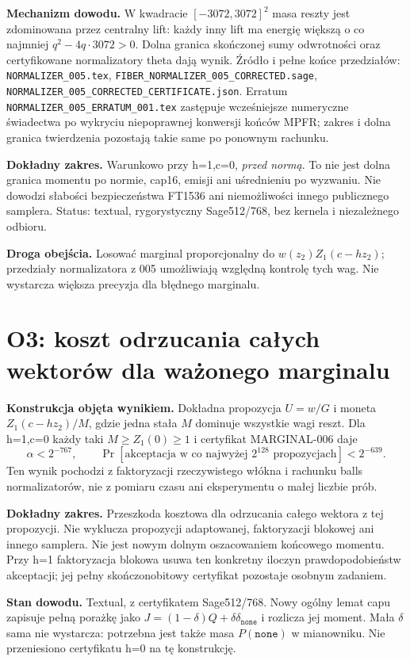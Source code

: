 \documentclass[11pt,a4paper]{article}
\newcommand{\code}[1]{\nolinkurl{#1}}
\begin{document}
\textbf{Mechanizm dowodu.} W kwadracie $[-3072,3072]^2$ masa reszty
jest zdominowana przez centralny lift: każdy inny lift ma energię większą
o co najmniej $q^2-4q\cdot3072>0$. Dolna granica skończonej sumy
odwrotności oraz certyfikowane normalizatory theta dają wynik.
Źródło i pełne końce przedziałów: \code{NORMALIZER_005.tex},
\code{FIBER_NORMALIZER_005_CORRECTED.sage},
\code{NORMALIZER_005_CORRECTED_CERTIFICATE.json}.
Erratum \code{NORMALIZER_005_ERRATUM_001.tex} zastępuje wcześniejsze
numeryczne świadectwa po wykryciu niepoprawnej konwersji końców MPFR;
zakres i dolna granica twierdzenia pozostają takie same po ponownym rachunku.

\textbf{Dokładny zakres.} Warunkowo przy h=1,c=0, \emph{przed normą}.
To nie jest dolna granica momentu po normie, cap16, emisji ani uśrednieniu
po wyzwaniu. Nie dowodzi słabości bezpieczeństwa FT1536 ani niemożliwości
innego publicznego samplera. Status: textual, rygorystyczny Sage512/768,
bez kernela i niezależnego odbioru.

\textbf{Droga obejścia.} Losować marginal proporcjonalny do
$w(z_2)Z_1(c-hz_2)$; przedziały normalizatora z 005 umożliwiają względną
kontrolę tych wag. Nie wystarcza większa precyzja dla błędnego marginalu.

\section{O3: koszt odrzucania całych wektorów dla ważonego marginalu}
\textbf{Konstrukcja objęta wynikiem.} Dokładna propozycja $U=w/G$ i moneta
$Z_1(c-hz_2)/M$, gdzie jedna stała $M$ dominuje wszystkie wagi reszt.
Dla h=1,c=0 każdy taki $M\ge Z_1(0)\ge1$ i certyfikat MARGINAL-006 daje
\[
 \alpha<2^{-767},\qquad
 \Pr[\text{akceptacja w co najwyżej }2^{128}\text{ propozycjach}]<2^{-639}.
\]
Ten wynik pochodzi z faktoryzacji rzeczywistego włókna i rachunku balls
normalizatorów, nie z pomiaru czasu ani eksperymentu o małej liczbie prób.

\textbf{Dokładny zakres.} Przeszkoda kosztowa dla odrzucania całego wektora
z tej propozycji. Nie wyklucza propozycji adaptowanej, faktoryzacji blokowej
ani innego samplera. Nie jest nowym dolnym oszacowaniem końcowego momentu.
Przy h=1 faktoryzacja blokowa usuwa ten konkretny iloczyn prawdopodobieństw
akceptacji; jej pełny skończonobitowy certyfikat pozostaje osobnym zadaniem.

\textbf{Stan dowodu.} Textual, z certyfikatem Sage512/768.
Nowy ogólny lemat capu zapisuje pełną porażkę jako
$J=(1-\delta)Q+\delta\delta_{\mathtt{none}}$ i rozlicza jej moment.
Mała $\delta$ sama nie wystarcza: potrzebna jest także masa
$P(\mathtt{none})$ w mianowniku. Nie przeniesiono certyfikatu h=0
na tę konstrukcję.
\end{document}
